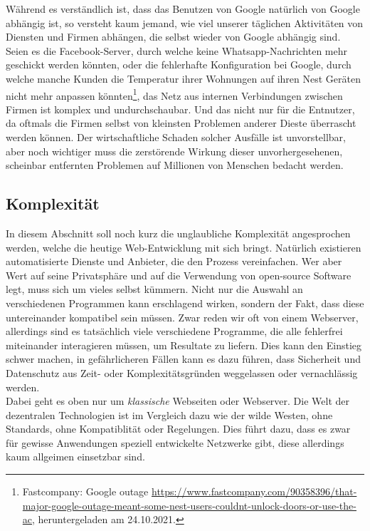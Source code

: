 \documentclass[11pt]{article}
\begin{document}
\noindent Während es verständlich ist, dass das Benutzen von Google
natürlich von Google abhängig ist, so versteht kaum jemand, wie viel
unserer täglichen Aktivitäten von Diensten und Firmen abhängen, die
selbst wieder von Google abhängig sind. Seien es die Facebook-Server,
durch welche keine Whatsapp-Nachrichten mehr geschickt werden könnten,
oder die fehlerhafte Konfiguration bei Google, durch welche manche
Kunden die Temperatur ihrer Wohnungen auf ihren Nest Geräten nicht
mehr anpassen könnten\footnote{Fastcompany: Google outage
\url{https://www.fastcompany.com/90358396/that-major-google-outage-meant-some-nest-users-couldnt-unlock-doors-or-use-the-ac},
heruntergeladen am 24.10.2021.}, das Netz aus internen Verbindungen
zwischen Firmen ist komplex und undurchschaubar. Und das nicht nur für
die Entnutzer, da oftmals die Firmen selbst von kleinsten Problemen
anderer Dieste überrascht werden können. Der wirtschaftliche Schaden
solcher Ausfälle ist unvorstellbar, aber noch wichtiger muss die
zerstörende Wirkung dieser unvorhergesehenen, scheinbar entfernten
Problemen auf Millionen von Menschen bedacht werden.
\subsection{Komplexität}
\label{sec:org846070b}
In diesem Abschnitt soll noch kurz die unglaubliche Komplexität
angesprochen werden, welche die heutige Web-Entwicklung mit sich
bringt. Natürlich existieren automatisierte Dienste und Anbieter, die
den Prozess vereinfachen. Wer aber Wert auf seine Privatsphäre und auf
die Verwendung von open-source Software legt, muss sich um vieles
selbst kümmern. Nicht nur die Auswahl an verschiedenen Programmen kann
erschlagend wirken, sondern der Fakt, dass diese untereinander
kompatibel sein müssen. Zwar reden wir oft von einem Webserver,
allerdings sind es tatsächlich viele verschiedene Programme, die alle
fehlerfrei miteinander interagieren müssen, um Resultate zu liefern.
Dies kann den Einstieg schwer machen, in gefährlicheren Fällen kann es
dazu führen, dass Sicherheit und Datenschutz aus Zeit- oder
Komplexitätsgründen weggelassen oder vernachlässig werden.\\

\noindent Dabei geht es oben nur um \emph{klassische} Webseiten oder
Webserver. Die Welt der dezentralen Technologien ist im Vergleich dazu
wie der wilde Westen, ohne Standards, ohne Kompatiblität oder
Regelungen. Dies führt dazu, dass es zwar für gewisse Anwendungen
speziell entwickelte Netzwerke gibt, diese allerdings kaum allgeimen
einsetzbar sind.
\end{document}
